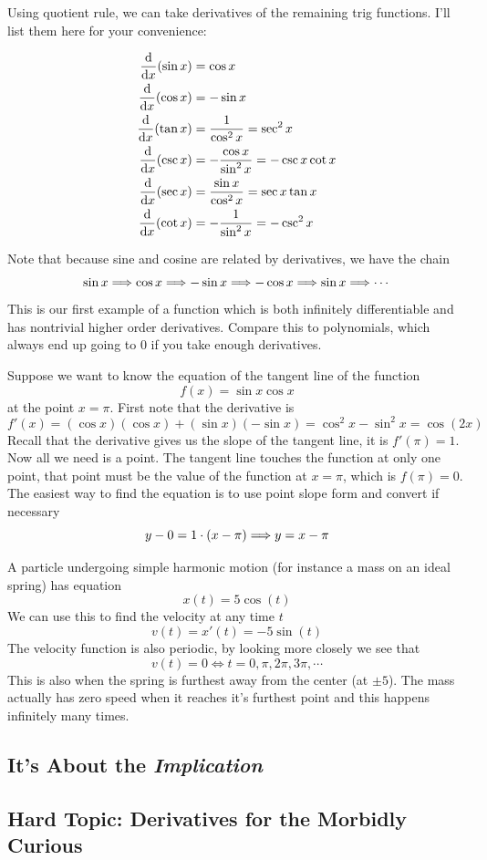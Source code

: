 Using quotient rule, we can take derivatives of the remaining trig functions. I'll list them here for your convenience:
\begin{proposition}
	\begin{align*}
		\dv{x} (\sin x) &= \cos x \\
		\dv{x} (\cos x) &= -\sin x \\
		\dv{x} (\tan x) &= \frac{1}{\cos^2 x} = \sec^2 x \\
		\dv{x} (\csc x) &= - \frac{\cos x}{\sin^2 x} = -\csc x \cot x \\
		\dv{x} (\sec x) &= \frac{\sin x}{\cos^2 x} = \sec x \tan x \\
		\dv{x} (\cot x) &= -\frac{1}{\sin^2 x} = -\csc^2 x \\
	\end{align*}
\end{proposition}

Note that because sine and cosine are related by derivatives, we have the chain
\[ \sin x \Longrightarrow \cos x \Longrightarrow -\sin x \Longrightarrow -\cos x \Longrightarrow \sin x \Longrightarrow \cdots \]
This is our first example of a function which is both infinitely differentiable and has nontrivial higher order derivatives. Compare this to polynomials, which always end up going to 0 if you take enough derivatives.

\begin{example}
	Suppose we want to know the equation of the tangent line of the function
	\[ f(x) = \sin x \cos x \]
	at the point $x = \pi$. First note that the derivative is
	\[ f'(x) = (\cos x)(\cos x) + (\sin x)(-\sin x) = \cos^2 x - \sin^2 x = \cos(2x) \]
	Recall that the derivative gives us the slope of the tangent line, it is $f'(\pi) = 1$. Now all we need is a point. The tangent line touches the function at only one point, that point must be the value of the function at $x = \pi$, which is $f(\pi) = 0$. The easiest way to find the equation is to use point slope form and convert if necessary
	\[ y - 0 = 1 \cdot (x - \pi) \Longrightarrow y = x - \pi \]
\end{example}

\begin{example}
	A particle undergoing simple harmonic motion (for instance a mass on an ideal spring) has equation
	\[ x(t) = 5 \cos(t) \]
	We can use this to find the velocity at any time $t$
	\[ v(t) = x'(t) = -5 \sin(t) \]
	The velocity function is also periodic, by looking more closely we see that 
	\[ v(t) = 0 \iff t = 0, \pi, 2\pi, 3\pi, \cdots \]
	This is also when the spring is furthest away from the center (at $\pm 5$). The mass actually has zero speed when it reaches it's furthest point and this happens infinitely many times.
\end{example}

\newpage 
\subsection{It's About the \emph{Implication}}
\subsection{Hard Topic: Derivatives for the Morbidly Curious}